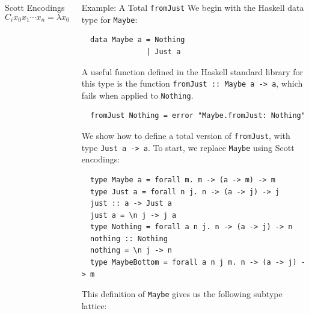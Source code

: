 \documentclass[final]{beamer}
\begin{document}
\begin{frame}[fragile]
\begin{columns}[t]
\begin{column}{.285\textwidth}
\begin{block}{Scott Encodings}
$$C_i x_0 x_1 \cdots x_n = \lambda x_0 x_1 \cdots x_n c_0 c_1 \cdots c_m . c_i x_0 x_1 \cdots x_n$$
\end{block}
\end{column}

\begin{column}{.33\textwidth}
\begin{block}{Example: A Total \texttt{fromJust}}
\vspace{0.5cm}
We begin with the Haskell data type for \texttt{Maybe}:

\begin{verbatim}
  data Maybe a = Nothing
               | Just a
\end{verbatim}

A useful function defined in the Haskell standard library for this type is the
function \texttt{fromJust :: Maybe a -> a}, which fails when applied to
\texttt{Nothing}.

\begin{verbatim}
  fromJust Nothing = error "Maybe.fromJust: Nothing"
\end{verbatim}

We show how to define a total version of \texttt{fromJust}, with type
\texttt{Just a -> a}. To start, we replace \texttt{Maybe} using Scott
encodings:

\begin{verbatim}
  type Maybe a = forall m. m -> (a -> m) -> m 
  type Just a = forall n j. n -> (a -> j) -> j
  just :: a -> Just a
  just a = \n j -> j a
  type Nothing = forall a n j. n -> (a -> j) -> n
  nothing :: Nothing
  nothing = \n j -> n
  type MaybeBottom = forall a n j m. n -> (a -> j) -> m
\end{verbatim}

This definition of \texttt{Maybe} gives us the following subtype lattice:

\begin{figure}[!h]
\centering
{}
\end{figure}
\end{block}
\end{column}
\end{columns}
\end{frame}
\end{document}
